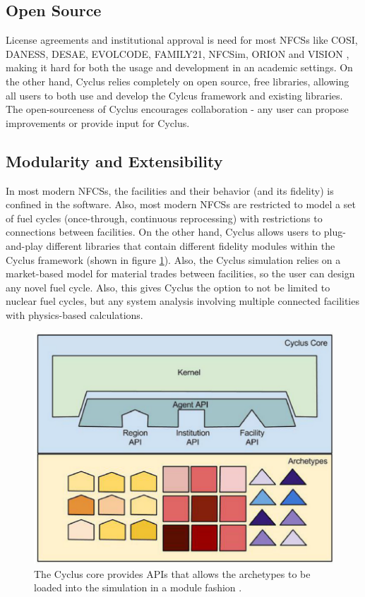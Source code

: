 \subsection{Open Source}
License agreements and institutional
approval is need for most \glspl{NFCS} like COSI, DANESS, DESAE, EVOLCODE,
FAMILY21, NFCSim, ORION and VISION \cite{jacobson_verifiable_2010-1}, making
it hard for both the usage and development in an academic settings.
On the other hand, Cyclus relies completely on open source,
free libraries, allowing all users to both use and develop the
Cylcus framework and existing libraries. The open-sourceness
of Cyclus encourages collaboration - any user can propose
improvements or provide input for Cyclus.

\subsection{Modularity and Extensibility}
In most modern \glspl{NFCS}, the facilities and their
behavior (and its fidelity) is confined in the software.
Also, most modern \glspl{NFCS} are restricted to model
a set of fuel cycles (once-through, continuous reprocessing)
with restrictions to connections between facilities. On the
other hand, Cyclus allows users to plug-and-play different libraries
that contain different fidelity modules within the Cyclus framework
(shown in figure \ref{fig:core}).
Also, the Cyclus simulation relies on a market-based model
for material trades between facilities, so the user can design
any novel fuel cycle. Also, this gives Cyclus the option to not
be limited to nuclear fuel cycles, but any system analysis
involving multiple connected facilities with physics-based
calculations.


\begin{figure}[htbp!]
	\begin{center}
		\includegraphics[scale=0.2]{./images/cyclus_core.png}
	\end{center}
	\caption{The Cyclus core provides APIs that allows the archetypes
			to be loaded into the simulation in a module fashion
			\cite{huff_fundamental_2016}.}
	\label{fig:core}
\end{figure}

